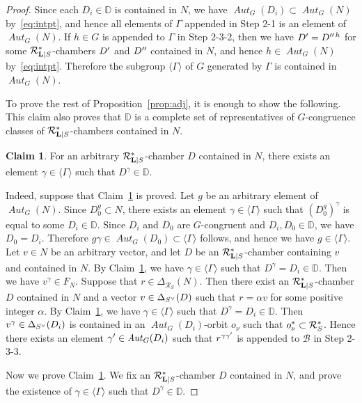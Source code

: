 \documentclass{amsart}
\theoremstyle{plain}
\theoremstyle{definition}
\newtheorem{claim}[theorem]{Claim}
\theoremstyle{remark}
\numberwithin{equation}{section}
\numberwithin{table}{section}
\numberwithin{figure}{section}
\newcommand{\D}{\mathord{\mathbb D}}
\newcommand{\BBB}{\mathord{\mathcal B}}
\newcommand{\RRR}{\mathord{\mathcal R}}
\newcommand{\gen}[1]{\langle {#1}  \rangle}
\newcommand{\sprime}{\sp\prime}
\newcommand{\spprime}{\sp{\prime\prime}}
\newcommand{\dual}{\sp{\vee}}
\renewcommand{\L}{\mathord{\mathbf{L}}}
\newcommand{\aut}{\operatorname{\mathit {Aut}}\nolimits}
\newcommand{\autG}{\aut_G}
\newcommand{\Chams}{\D}
\newcommand{\Roots}{\RRR}
\newcommand{\sphyp}{\sp*}
\newcommand{\RtsLS}{\Roots_{\L|S}}
\newcommand{\Nc}{N}
\begin{document}
%
\begin{proof} 
Since each $D_i\in \Chams$ is contained in $\Nc$,
we have $\autG(D_i)\subset \autG(\Nc)$ by~\eqref{eq:intpt},
and hence all elements of $\varGamma$ appended in Step 2-1 is an element of $\autG(\Nc)$.
If $h\in G$ is appended to $\varGamma$ in Step 2-3-2,
then we have $D\sp{\prime}=D\sp{\prime\prime \, h}$ for some $\RtsLS\sphyp$-chambers $D\sprime$ and $D\spprime$
contained in $\Nc$, and hence $h\in \autG(\Nc)$ by~\eqref{eq:intpt}.
Therefore the subgroup $\gen{\varGamma}$ of $G$ generated by $\varGamma$ is contained in $\autG(\Nc)$.
\par
To prove the rest of Proposition~\ref{prop:adj}, 
it is enough to show the following.
This claim also proves that $\Chams$ is a complete set of representatives of 
$G$-congruence classes of $\RtsLS\sphyp$-chambers contained in $\Nc$.
%
\begin{claim}\label{claim}
For an arbitrary $\RtsLS\sphyp$-chamber $D$ contained in $\Nc$,
 there exists an element  $\gamma\in \gen{\varGamma}$
such that $D^\gamma\in \Chams$.
\end{claim}
%
Indeed, suppose that Claim~\ref{claim} is proved.
Let $g$ be an arbitrary element of $\autG(\Nc)$.
Since $D_0^g\subset \Nc$, there exists an element $\gamma\in \gen{\varGamma}$
such that  $(D_0^g)^\gamma$ is equal to some $D_i \in \Chams$.
Since  $D_i$ and $D_0$ are $G$-congruent and $D_i, D_0\in \Chams$, we have $D_0=D_i$.
Therefore  $g\gamma \in \autG(D_0)\subset \gen{\varGamma}$ follows,
and hence we have $g\in \gen{\varGamma}$.
Let $v\in \Nc$ be an arbitrary vector,
and let $D$ be an $\RtsLS\sphyp$-chamber containing $v$ and contained in $\Nc$.
By Claim~\ref{claim},
we have $\gamma\in \gen{\varGamma}$
such that 
$D^\gamma=D_i \in \Chams$. 
Then we have 
$v^\gamma\in F_{\Nc}$.
Suppose that $r\in \Delta_{\Roots_S}(\Nc)$.
Then there exist an $\RtsLS\sphyp$-chamber $D$ contained in $\Nc$ and 
a vector $v\in \Delta_{S\dual}(D)$ 
such that $r=\alpha v$ for some positive integer $\alpha$.
By Claim~\ref{claim},
we have $\gamma\in \gen{\varGamma}$
such that  $D^\gamma=D_i \in \Chams$.
Then  $v^\gamma \in \Delta_{S\dual}(D_i)$ is contained in an $\aut_{G}(D_i)$-orbit  $o_{\nu}$
such that $o_{\nu}\sphyp\subset\Roots_{S}\sphyp$.
Hence there exists  an element $\gamma\sprime\in \aut_{G}(D_i)$ such that
$r^{\gamma \gamma\sprime}$ is appended to $\BBB$ in Step 2-3-3.
%
\par
Now we prove Claim~\ref{claim}.
We fix an $\RtsLS\sphyp$-chamber $D$ contained in $\Nc$,
and prove the existence of  $\gamma\in \gen{\varGamma}$ such that $D^\gamma\in \Chams$.

\end{proof}
\end{document}
